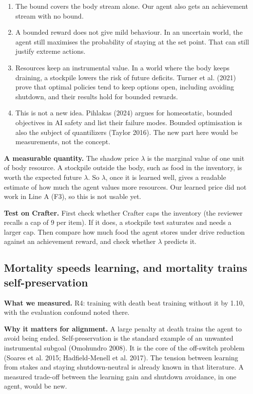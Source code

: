 \documentclass[11pt]{article}
\begin{document}
\begin{enumerate}
\item The bound covers the body stream alone. Our agent also gets an achievement stream with no bound.
\item A bounded reward does not give mild behaviour. In an uncertain world, the agent still maximises the probability of staying at the set point. That can still justify extreme actions.
\item Resources keep an instrumental value. In a world where the body keeps draining, a stockpile lowers the risk of future deficits. Turner et al. (2021) prove that optimal policies tend to keep options open, including avoiding shutdown, and their results hold for bounded rewards.
\item This is not a new idea. Pihlakas (2024) argues for homeostatic, bounded objectives in AI safety and list their failure modes. Bounded optimisation is also the subject of quantilizers (Taylor 2016). The new part here would be measurements, not the concept.
\end{enumerate}

\textbf{A measurable quantity.} The shadow price $\lambda$ is the marginal value of one unit of body resource. A stockpile outside the body, such as food in the inventory, is worth the expected future $\lambda$. So $\lambda$, once it is learned well, gives a readable estimate of how much the agent values more resources. Our learned price did not work in Line A (F3), so this is not usable yet.

\textbf{Test on Crafter.} First check whether Crafter caps the inventory (the reviewer recalls a cap of 9 per item). If it does, a stockpile test saturates and needs a larger cap. Then compare how much food the agent stores under drive reduction against an achievement reward, and check whether $\lambda$ predicts it.

\subsection{Mortality speeds learning, and mortality trains self-preservation}

\textbf{What we measured.} R4: training with death beat training without it by 1.10, with the evaluation confound noted there.

\textbf{Why it matters for alignment.} A large penalty at death trains the agent to avoid being ended. Self-preservation is the standard example of an unwanted instrumental subgoal (Omohundro 2008). It is the core of the off-switch problem (Soares et al. 2015; Hadfield-Menell et al. 2017). The tension between learning from stakes and staying shutdown-neutral is already known in that literature. A measured trade-off between the learning gain and shutdown avoidance, in one agent, would be new.
\end{document}
